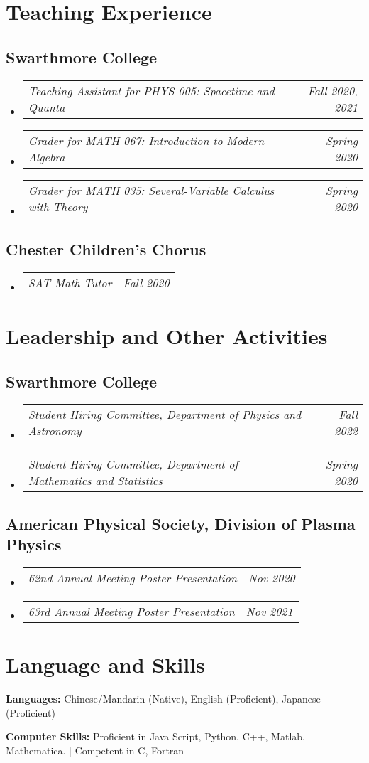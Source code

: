 \documentclass[letterpaper,11pt]{article}
\makeatletter
\newcommand{\resumeSubSubheading}[2]{
    \vspace{-8pt}\item
    \begin{tabular*}{0.97\textwidth}{l@{\extracolsep{\fill}}r}
      \textit{\small#1} & \textit{\small #2} \\
    \end{tabular*}\vspace{-10pt}
}
\newcommand{\resumeSubHeadingListStart}{\begin{itemize}[leftmargin=0.15in, label={}]}
\newcommand{\resumeSubHeadingListEnd}{\end{itemize}}
\makeatother
\begin{document}
\section{Teaching Experience}
  \vspace{3pt}
\subsection*{Swarthmore College}
\resumeSubHeadingListStart
\resumeSubSubheading{Teaching Assistant for PHYS 005: Spacetime and Quanta}{Fall 2020, 2021}
\resumeSubSubheading{Grader for MATH 067: Introduction to Modern Algebra}{Spring 2020}
\resumeSubSubheading{Grader for MATH 035: Several-Variable Calculus with Theory}{Spring 2020}
\resumeSubHeadingListEnd
\subsection*{Chester Children's Chorus}
\resumeSubHeadingListStart
\resumeSubSubheading{SAT Math Tutor}{Fall 2020}
\resumeSubHeadingListEnd
\vspace{1pt}
\section{Leadership and Other Activities}
  \vspace{3pt}
\subsection*{Swarthmore College}
\resumeSubHeadingListStart
\resumeSubSubheading{Student Hiring Committee, Department of Physics and Astronomy}{Fall 2022}
\resumeSubSubheading{Student Hiring Committee, Department of Mathematics and Statistics}{Spring 2020}
\resumeSubHeadingListEnd
\subsection*{American Physical Society, Division of Plasma Physics}
\resumeSubHeadingListStart
\resumeSubSubheading{62nd Annual Meeting Poster Presentation}{Nov 2020}
\resumeSubSubheading{63rd Annual Meeting Poster Presentation}{Nov 2021}
\resumeSubHeadingListEnd

\section{Language and Skills}
  \vspace{2pt}
  \resumeSubHeadingListStart
    \small{\item{
        
        \textbf{Languages:}{ Chinese/Mandarin (Native), English (Proficient), Japanese (Proficient)} \\ \vspace{3pt}
        
        \textbf{Computer Skills:}{ Proficient in Java Script, Python, C++, Matlab, Mathematica. $|$ Competent in C, Fortran} \\ \vspace{3pt}
        
        
    }}
  \resumeSubHeadingListEnd
\end{document}
